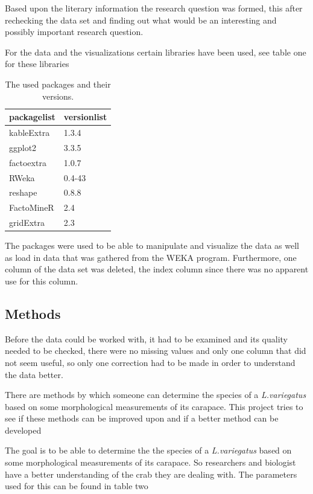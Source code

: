 \documentclass[
]{article}
\begin{document}
Based upon the literary information the research question was formed,
this after rechecking the data set and finding out what would be an
interesting and possibly important research question.

For the data and the visualizations certain libraries have been used,
see table one for these libraries

\begin{table}[!h]

\caption{\label{tab:packages}The used packages and their versions.}
\centering
\begin{tabular}[t]{l|l}
\hline
packagelist & versionlist\\
\hline
kableExtra & 1.3.4\\
\hline
ggplot2 & 3.3.5\\
\hline
factoextra & 1.0.7\\
\hline
RWeka & 0.4-43\\
\hline
reshape & 0.8.8\\
\hline
FactoMineR & 2.4\\
\hline
gridExtra & 2.3\\
\hline
\end{tabular}
\end{table}

The packages were used to be able to manipulate and visualize the data
as well as load in data that was gathered from the WEKA program.
Furthermore, one column of the data set was deleted, the index column
since there was no apparent use for this column.

\newpage

\hypertarget{methods}{%
\subsection{Methods}\label{methods}}

Before the data could be worked with, it had to be examined and its
quality needed to be checked, there were no missing values and only one
column that did not seem useful, so only one correction had to be made
in order to understand the data better.

There are methods by which someone can determine the species of a
\emph{L.variegatus} based on some morphological measurements of its
carapace. This project tries to see if these methods can be improved
upon and if a better method can be developed

The goal is to be able to determine the the species of a
\emph{L.variegatus} based on some morphological measurements of its
carapace. So researchers and biologist have a better understanding of
the crab they are dealing with. The parameters used for this can be
found in table two
\end{document}
